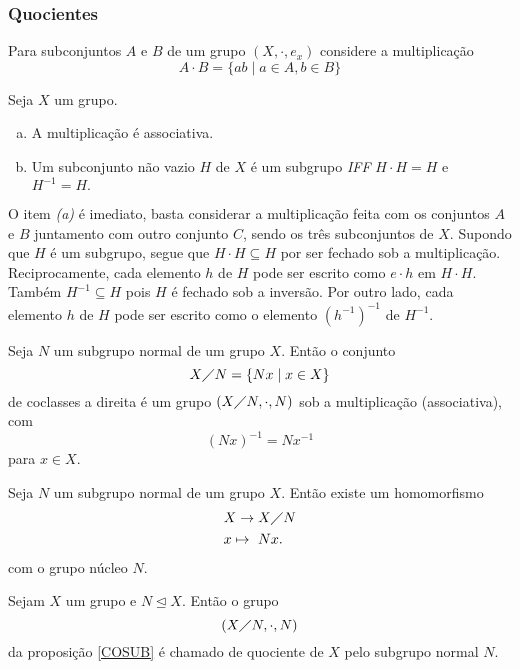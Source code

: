       \subsubsection{Quocientes}
         Para subconjuntos $A$ e $B$ de um grupo $(X,\cdot, e_{x})$ considere a multiplicação
         $$A \cdot B = \{ab \mid a \in A , b \in B\}$$
         \begin{stat}
            Seja $X$ um grupo.
            \begin{enumerate}[(a)]
               \item A multiplicação é associativa.
               \item Um subconjunto não vazio $H$ de $X$ é um subgrupo \emph{IFF} $H \cdot H = H$ e $H^{-1} = H.$
            \end{enumerate} 
         \end{stat}
         O item \emph{(a)} é imediato, basta considerar a multiplicação feita com os conjuntos $A$ e $B$ juntamento com outro conjunto $C$, sendo os três subconjuntos de $X$. Supondo que $H$ é um subgrupo, segue que $H\cdot H \subseteq H$ por ser fechado sob a multiplicação. Reciprocamente, cada elemento $h$ de $H$ pode ser escrito como $e\cdot h$ em $H\cdot H$.
         Também $H^{-1} \subseteq H$ pois $H$ é fechado sob a inversão. Por outro lado, cada elemento $h$ de $H$ pode ser escrito como o elemento $(h^{-1})^{-1}$ de $H^{-1}$.
         \begin{stat}\label{COSUB}
            Seja $N$ um subgrupo normal de um grupo $X$. Então o conjunto
            $$X \diagup N = \{Nx \mid x \in X\}$$ de coclasses a direita é um grupo $(X\diagup N, \cdot , N)$ sob a multiplicação (associativa), com $$(Nx)^{-1} = Nx^{-1}$$ para $x\in X$.
         \end{stat}
         \begin{corollary}\label{CORO1}
            Seja $N$ um subgrupo normal de um grupo $X$. Então existe um homomorfismo
            \begin{alignat}{2}
               &X \to X\diagup N \nonumber\\
               &x \mapsto\ Nx.
               \nonumber
            \end{alignat}
            com o grupo núcleo $N$.
         \end{corollary}
         \begin{definition}
            Sejam $X$ um grupo e $N \trianglelefteq X$. Então o grupo $$(X\diagup N, \cdot , N)$$ da proposição \ref{COSUB} é chamado de quociente de $X$ pelo subgrupo normal $N$.
         \end{definition}
